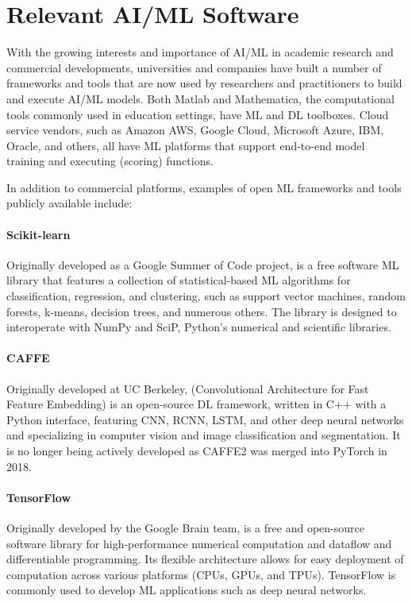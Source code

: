 \section{Relevant AI/ML Software}
\label{sec:ai_tools}

With the growing interests and importance of AI/ML in academic research and commercial developments, universities and companies have built a number of frameworks and tools that are now used by researchers and practitioners to build and execute AI/ML models. Both Matlab and Mathematica, the computational tools commonly used in education settings, have ML and DL toolboxes. Cloud service vendors, such as Amazon AWS, Google Cloud, Microsoft Azure, IBM, Oracle, and others, all have ML platforms that support end-to-end model training and executing (scoring) functions. 

In addition to commercial platforms, examples of open ML frameworks and tools publicly available include:

\paragraph{Scikit-learn}%
Originally developed as a Google Summer of Code project,  is a free software ML library that features a collection of statistical-based ML algorithms for classification, regression, and clustering, such as support vector machines, random forests, k-means, decision trees, and numerous others. The library is designed to interoperate with NumPy and SciP, Python's numerical and scientific libraries. 

\paragraph{CAFFE} 
Originally developed at UC Berkeley,  (Convolutional Architecture for Fast Feature Embedding) is an open-source DL framework, written in C++ with a Python interface, featuring CNN, RCNN, LSTM, and other deep neural networks and specializing in computer vision and image classification and segmentation. It is no longer being actively developed as CAFFE2 was merged into PyTorch in 2018.

\paragraph{TensorFlow} Originally developed by the Google Brain team,  is a free and open-source software library for high-performance numerical computation and dataflow and differentiable programming. Its flexible architecture allows for easy deployment of computation across various platforms (CPUs, GPUs, and TPUs). TensorFlow is commonly used to develop ML applications such as deep neural networks.

